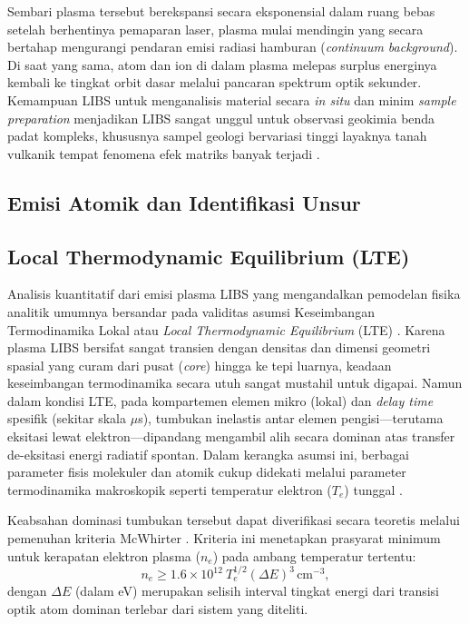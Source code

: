 Sembari plasma tersebut berekspansi secara eksponensial dalam ruang bebas setelah berhentinya pemaparan laser, plasma mulai mendingin yang secara bertahap mengurangi pendaran emisi radiasi hamburan (\textit{continuum background}). Di saat yang sama, atom dan ion di dalam plasma melepas surplus energinya kembali ke tingkat orbit dasar melalui pancaran spektrum optik sekunder. Kemampuan LIBS untuk menganalisis material secara \textit{in situ} dan minim \textit{sample preparation} menjadikan LIBS sangat unggul untuk observasi geokimia benda padat kompleks, khususnya sampel geologi bervariasi tinggi layaknya tanah vulkanik tempat fenomena efek matriks banyak terjadi \citep{sawyers_database_2025, hao_machine_2024}.

\subsection{Emisi Atomik dan Identifikasi Unsur}

\subsection{Local Thermodynamic Equilibrium (LTE)}

Analisis kuantitatif dari emisi plasma LIBS yang mengandalkan pemodelan fisika analitik umumnya bersandar pada validitas asumsi Keseimbangan Termodinamika Lokal atau \textit{Local Thermodynamic Equilibrium} (LTE) \citep{cristoforetti_local_2010}. Karena plasma LIBS bersifat sangat transien dengan densitas dan dimensi geometri spasial yang curam dari pusat (\textit{core}) hingga ke tepi luarnya, keadaan keseimbangan termodinamika secara utuh sangat mustahil untuk digapai. Namun dalam kondisi LTE, pada kompartemen elemen mikro (lokal) dan \textit{delay time} spesifik (sekitar skala $\mu$s), tumbukan inelastis antar elemen pengisi---terutama eksitasi lewat elektron---dipandang mengambil alih secara dominan atas transfer de-eksitasi energi radiatif spontan. Dalam kerangka asumsi ini, berbagai parameter fisis molekuler dan atomik cukup didekati melalui parameter termodinamika makroskopik seperti temperatur elektron ($T_e$) tunggal \citep{cristoforetti_local_2010}.

Keabsahan dominasi tumbukan tersebut dapat diverifikasi secara teoretis melalui pemenuhan kriteria McWhirter \citep{bultel_mcwhirter_2025, cristoforetti_local_2010}. Kriteria ini menetapkan prasyarat minimum untuk kerapatan elektron plasma ($n_e$) pada ambang temperatur tertentu:
\begin{equation} \label{eq:bab2_mcwhirter}
n_e \geq 1.6 \times 10^{12} \ T_e^{1/2} (\Delta E)^3 \, \text{cm}^{-3},
\end{equation}
dengan $\Delta E$ (dalam eV) merupakan selisih interval tingkat energi dari transisi optik atom dominan terlebar dari sistem yang diteliti.

